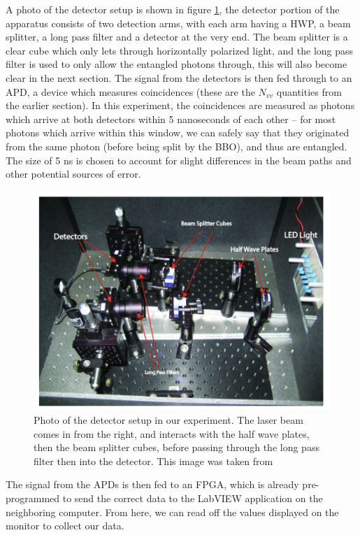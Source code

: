 \documentclass[10pt]{article}
\begin{document}
	A photo of the detector setup is shown in figure \ref{detector-photo}, 
	the detector portion of the apparatus consists of two detection arms, 
	with each arm having a HWP,
	a beam splitter, a long pass filter and a detector at the very end. The beam splitter is a clear cube
	which only lets through horizontally polarized light, and the long pass filter is used
	to only allow the entangled photons through, this will also become clear in the next section. 
	The signal from the detectors is then fed through
	to an APD, a device which measures coincidences (these are the \( N_{vv} \) quantities from the earlier
	section). In this experiment, the coincidences are measured as photons which arrive at both detectors
	within 5 nanoseconds of each other -- for most photons which arrive within this window, we can safely say
	that they originated from the same photon (before being split by the BBO), and thus are entangled. The
	size of 5 ns is chosen to account for slight differences in the beam paths and other potential sources of
	error. 
	\begin{figure}
		\centering
		\includegraphics[scale=0.5]{images/detector-photo.png}
		\caption{Photo of the detector setup in our experiment. The laser beam comes in from the right, and
			interacts with the half wave plates, then the beam splitter cubes, before passing through the long
		pass filter then into the detector. This image was taken from \cite{manual}}  
		\label{detector-photo}
	\end{figure}

	The signal from the APDs is then fed to an FPGA, which is already pre-programmed to send the correct data
	to the LabVIEW application on the neighboring computer. From here, we can read off the values displayed
	on the monitor to collect our data. 
\end{document}
